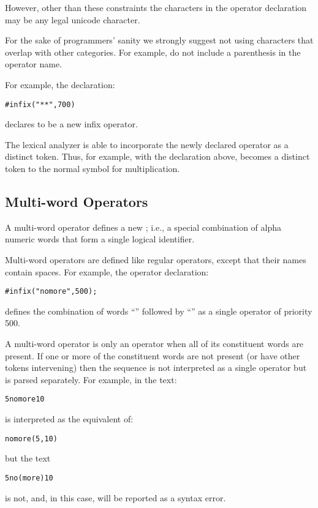 However, other than these constraints the characters in the operator declaration may be any legal unicode character.
\begin{aside}
For the sake of programmers' sanity we strongly suggest not using characters that overlap with other categories. For example, do not include a parenthesis in the operator name.
\end{aside}

For example, the declaration:
\begin{alltt}
\#infix("**",700)
\end{alltt}
declares \q{**} to be a new infix operator.

The lexical analyzer is able to incorporate the newly declared operator as a distinct token. Thus, for example, with the \q{**} declaration above, \q{**} becomes a distinct token to the normal symbol for multiplication.

\subsection{Multi-word Operators}
\label{multiWordOperators}
A multi-word operator defines a new ; i.e., a special combination of alpha numeric words that form a single logical identifier.

Multi-word operators are defined like regular operators, except that their names contain spaces. For example, the operator declaration:
\begin{alltt}
#infix("no more",500);
\end{alltt}
defines the combination of words ``'' followed by ``'' as a single operator of priority 500.

A multi-word operator is only an operator when all of its constituent words are present. If one or more of the constituent words are not present (or have other tokens intervening) then the sequence is not interpreted as a single operator but is parsed separately. For example, in the text:
\begin{alltt}
5 no more 10
\end{alltt}
is interpreted as the equivalent of:
\begin{alltt}
no\spce{}more(5,10)
\end{alltt}
but the text
\begin{alltt}
5 no (more) 10
\end{alltt}
is not, and, in this case, will be reported as a syntax error. 

